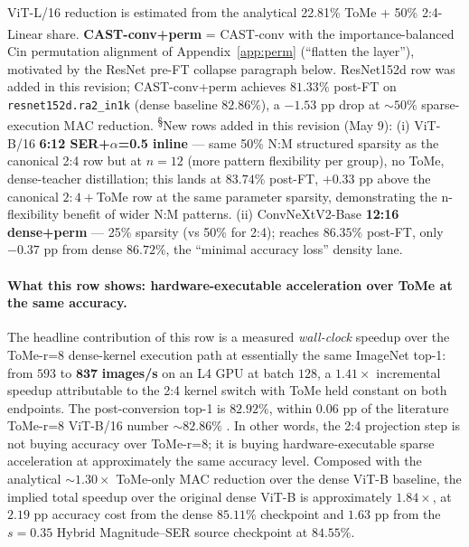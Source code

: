 \documentclass[11pt]{article}
\theoremstyle{plain}
\theoremstyle{definition}
\theoremstyle{remark}
\newcommand{\1}{\mathbf{1}}
\begin{document}
\begin{table}[ht]
\begin{tabular}{lccccc}
\bottomrule
\end{tabular}\\[2pt]
{\footnotesize \textsuperscript{\dag}ViT-L/16 reduction is estimated from the analytical 22.81\% ToMe + 50\% 2:4-Linear share. \textsuperscript{\ddag}\textbf{CAST-conv+perm} = CAST-conv with the importance-balanced Cin permutation alignment of Appendix~\ref{app:perm} (``flatten the layer''), motivated by the ResNet pre-FT collapse paragraph below.  ResNet152d row was added in this revision; CAST-conv+perm achieves \(81.33\%\) post-FT on \texttt{resnet152d.ra2\_in1k} (dense baseline \(82.86\%\)), a \(-1.53\) pp drop at \(\sim\!50\%\) sparse-execution MAC reduction.  \textsuperscript{\S}New rows added in this revision (May 9): (i) ViT-B/16 \textbf{6:12 SER+\(\alpha\)=0.5 inline} — same 50\% N:M structured sparsity as the canonical 2:4 row but at \(n=12\) (more pattern flexibility per group), no ToMe, dense-teacher distillation; this lands at \(83.74\%\) post-FT, \(\mathbf{+0.33}\) pp above the canonical \(2{:}4{+}\)ToMe row at the same parameter sparsity, demonstrating the n-flexibility benefit of wider N:M patterns. (ii) ConvNeXtV2-Base \textbf{12:16 dense+perm} — 25\% sparsity (vs 50\% for 2:4); reaches \(86.35\%\) post-FT, only \(-0.37\) pp from dense \(86.72\%\), the ``minimal accuracy loss'' density lane.}
\end{table}

\paragraph{What this row shows: hardware-executable acceleration over ToMe at the same accuracy.}
The headline contribution of this row is a measured \emph{wall-clock} speedup over the ToMe-r=8 dense-kernel execution path at essentially the same ImageNet top-1: from \(593\) to \(\mathbf{837}\) \textbf{images/s} on an L4 GPU at batch \(128\), a \(\mathbf{1.41\!\times}\) incremental speedup attributable to the 2:4 kernel switch with ToMe held constant on both endpoints.  The post-conversion top-1 is \(82.92\%\), within \(0.06\) pp of the literature ToMe-r=8 ViT-B/16 number \(\sim\!82.86\%\) \cite{bolya2023tome}.  In other words, the 2:4 projection step is not buying accuracy over ToMe-r=8; it is buying hardware-executable sparse acceleration at approximately the same accuracy level.  Composed with the analytical \(\sim\!1.30\!\times\) ToMe-only MAC reduction over the dense ViT-B baseline, the implied total speedup over the original dense ViT-B is approximately \(1.84\!\times\), at \(2.19\) pp accuracy cost from the dense \(85.11\%\) checkpoint and \(1.63\) pp from the \(s=0.35\) Hybrid Magnitude--SER source checkpoint at \(84.55\%\).
\end{document}
